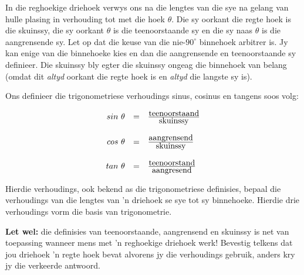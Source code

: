 

In die reghoekige driehoek verwys ons na die lengtes van die sye na gelang van hulle plasing in verhouding tot met die hoek $\theta $. Die sy oorkant die regte hoek is die skuinssy, die sy oorkant $\theta $ is die teenoorstaande sy en die sy naas $\theta $ is die aangrensende sy.
Let op dat die keuse van die nie-$90^{\circ}$ binnehoek arbitrer is. Jy kan enige van die binnehoeke kies en dan die aangrensende en teenoorstaande sy definieer. Die skuinssy bly egter die skuinssy ongeag die binnehoek van belang (omdat dit \textit{altyd} oorkant die regte hoek is en \textit{altyd} die langste sy is).

Ons definieer die trigonometriese verhoudings sinus, cosinus en tangens soos volg:


\begin{equation*}
\begin{array}{ccc}\hfill sin~\theta & =& \frac{\mbox{teenoorstaand}}{\mbox{skuinssy}}\hfill \\
\\
 \hfill cos~\theta & =& \frac{\mbox{aangrensend}}{\mbox{skuinssy}}\hfill \\
\\
 \hfill tan~\theta & =& \frac{\mbox{teenoorstand}}{\mbox{aangresend}}\hfill 
\end{array}
\end{equation*}

Hierdie verhoudings, ook bekend as die trigonometriese definisies, bepaal die verhoudings van die lengtes van 'n driehoek se sye tot sy binnehoeke. 
Hierdie drie verhoudings vorm die basis van trigonometrie. \par

\textbf{Let wel: }die definisies van teenoorstaande, aangrensend en skuinssy is net van toepassing wanneer mens met 'n reghoekige driehoek werk! Bevestig telkens dat jou driehoek 'n regte hoek bevat alvorens jy die verhoudings gebruik, anders kry jy die verkeerde antwoord.



